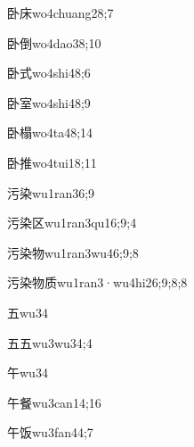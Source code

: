\begin{verbete}{卧床}{wo4chuang2}{8;7}
\end{verbete}
\begin{verbete}{卧倒}{wo4dao3}{8;10}
\end{verbete}
\begin{verbete}{卧式}{wo4shi4}{8;6}
\end{verbete}
\begin{verbete}{卧室}{wo4shi4}{8;9}
\end{verbete}
\begin{verbete}{卧榻}{wo4ta4}{8;14}
\end{verbete}
\begin{verbete}{卧推}{wo4tui1}{8;11}
\end{verbete}
\begin{verbete}{污染}{wu1ran3}{6;9}
\end{verbete}
\begin{verbete}{污染区}{wu1ran3qu1}{6;9;4}
\end{verbete}
\begin{verbete}{污染物}{wu1ran3wu4}{6;9;8}
\end{verbete}
\begin{verbete}{污染物质}{wu1ran3·wu4hi2}{6;9;8;8}
\end{verbete}
\begin{verbete}{五}{wu3}{4}
\end{verbete}
\begin{verbete}{五五}{wu3wu3}{4;4}
\end{verbete}
\begin{verbete}{午}{wu3}{4}
\end{verbete}
\begin{verbete}{午餐}{wu3can1}{4;16}
\end{verbete}
\begin{verbete}{午饭}{wu3fan4}{4;7}
\end{verbete}
